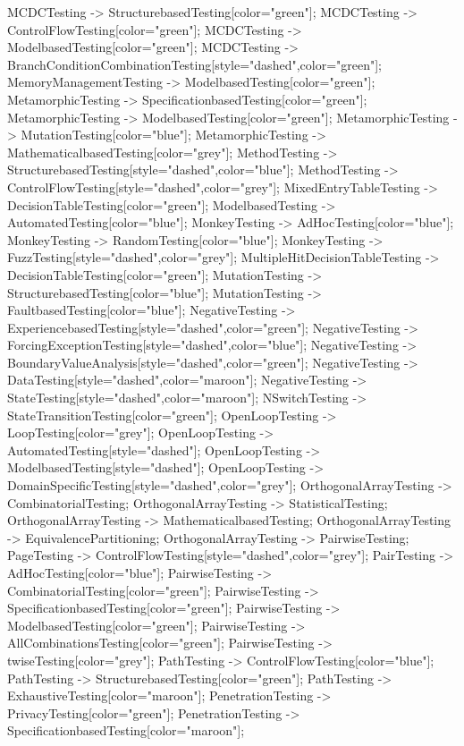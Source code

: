 \documentclass{article}
\begin{document}
{MCDCTesting -> StructurebasedTesting[color="green"];
MCDCTesting -> ControlFlowTesting[color="green"];
MCDCTesting -> ModelbasedTesting[color="green"];
MCDCTesting -> BranchConditionCombinationTesting[style="dashed",color="green"];
MemoryManagementTesting -> ModelbasedTesting[color="green"];
MetamorphicTesting -> SpecificationbasedTesting[color="green"];
MetamorphicTesting -> ModelbasedTesting[color="green"];
MetamorphicTesting -> MutationTesting[color="blue"];
MetamorphicTesting -> MathematicalbasedTesting[color="grey"];
MethodTesting -> StructurebasedTesting[style="dashed",color="blue"];
MethodTesting -> ControlFlowTesting[style="dashed",color="grey"];
MixedEntryTableTesting -> DecisionTableTesting[color="green"];
ModelbasedTesting -> AutomatedTesting[color="blue"];
MonkeyTesting -> AdHocTesting[color="blue"];
MonkeyTesting -> RandomTesting[color="blue"];
MonkeyTesting -> FuzzTesting[style="dashed",color="grey"];
MultipleHitDecisionTableTesting -> DecisionTableTesting[color="green"];
MutationTesting -> StructurebasedTesting[color="blue"];
MutationTesting -> FaultbasedTesting[color="blue"];
NegativeTesting -> ExperiencebasedTesting[style="dashed",color="green"];
NegativeTesting -> ForcingExceptionTesting[style="dashed",color="blue"];
NegativeTesting -> BoundaryValueAnalysis[style="dashed",color="green"];
NegativeTesting -> DataTesting[style="dashed",color="maroon"];
NegativeTesting -> StateTesting[style="dashed",color="maroon"];
NSwitchTesting -> StateTransitionTesting[color="green"];
OpenLoopTesting -> LoopTesting[color="grey"];
OpenLoopTesting -> AutomatedTesting[style="dashed"];
OpenLoopTesting -> ModelbasedTesting[style="dashed"];
OpenLoopTesting -> DomainSpecificTesting[style="dashed",color="grey"];
OrthogonalArrayTesting -> CombinatorialTesting;
OrthogonalArrayTesting -> StatisticalTesting;
OrthogonalArrayTesting -> MathematicalbasedTesting;
OrthogonalArrayTesting -> EquivalencePartitioning;
OrthogonalArrayTesting -> PairwiseTesting;
PageTesting -> ControlFlowTesting[style="dashed",color="grey"];
PairTesting -> AdHocTesting[color="blue"];
PairwiseTesting -> CombinatorialTesting[color="green"];
PairwiseTesting -> SpecificationbasedTesting[color="green"];
PairwiseTesting -> ModelbasedTesting[color="green"];
PairwiseTesting -> AllCombinationsTesting[color="green"];
PairwiseTesting -> twiseTesting[color="grey"];
PathTesting -> ControlFlowTesting[color="blue"];
PathTesting -> StructurebasedTesting[color="green"];
PathTesting -> ExhaustiveTesting[color="maroon"];
PenetrationTesting -> PrivacyTesting[color="green"];
PenetrationTesting -> SpecificationbasedTesting[color="maroon"];
}
\end{document}
